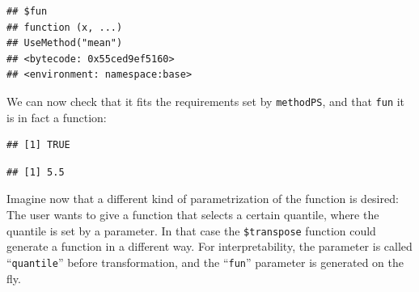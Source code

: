 \documentclass[
]{scrbook}
\newenvironment{Shaded}{\begin{snugshade}}{\end{snugshade}}
\newcommand{\AttributeTok}[1]{\textcolor[rgb]{0.77,0.63,0.00}{#1}}
\newcommand{\CommentTok}[1]{\textcolor[rgb]{0.56,0.35,0.01}{\textit{#1}}}
\newcommand{\ControlFlowTok}[1]{\textcolor[rgb]{0.13,0.29,0.53}{\textbf{#1}}}
\newcommand{\DecValTok}[1]{\textcolor[rgb]{0.00,0.00,0.81}{#1}}
\newcommand{\FunctionTok}[1]{\textcolor[rgb]{0.00,0.00,0.00}{#1}}
\newcommand{\NormalTok}[1]{#1}
\newcommand{\OtherTok}[1]{\textcolor[rgb]{0.56,0.35,0.01}{#1}}
\newcommand{\SpecialCharTok}[1]{\textcolor[rgb]{0.00,0.00,0.00}{#1}}
\newcommand{\StringTok}[1]{\textcolor[rgb]{0.31,0.60,0.02}{#1}}
\renewenvironment{Shaded} {\begin{snugshade}\small} {\end{snugshade}}
\begin{document}
\begin{verbatim}
## $fun
## function (x, ...) 
## UseMethod("mean")
## <bytecode: 0x55ced9ef5160>
## <environment: namespace:base>
\end{verbatim}

We can now check that it fits the requirements set by \texttt{methodPS}, and that \texttt{fun} it is in fact a function:

\begin{Shaded}
\end{Shaded}

\begin{verbatim}
## [1] TRUE
\end{verbatim}

\begin{Shaded}
\end{Shaded}

\begin{verbatim}
## [1] 5.5
\end{verbatim}

Imagine now that a different kind of parametrization of the function is desired:
The user wants to give a function that selects a certain quantile, where the quantile is set by a parameter.
In that case the \texttt{\$transpose} function could generate a function in a different way.
For interpretability, the parameter is called ``\texttt{quantile}'' before transformation, and the ``\texttt{fun}'' parameter is generated on the fly.

\begin{Shaded}
\end{Shaded}
\end{document}
